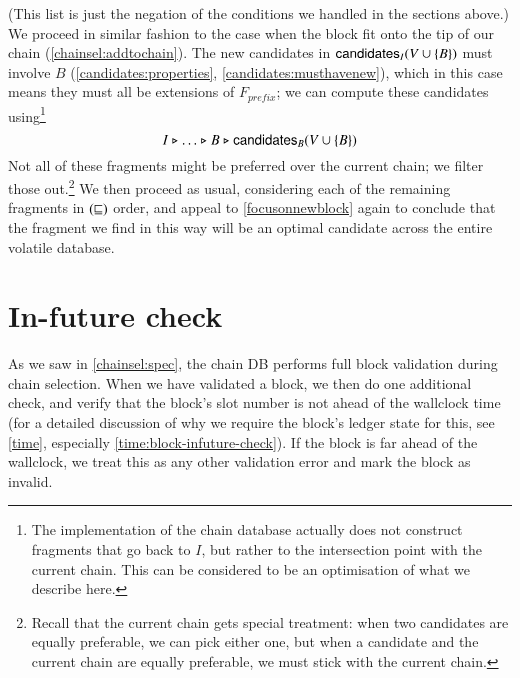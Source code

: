 (This list is just the negation of the conditions we handled in the sections
above.)
We proceed in similar fashion to the case when the block fit onto the tip of our
chain (\cref{chainsel:addtochain}). The new candidates in $\mathsf{candidates}_I(V \cup
\{B\})$ must involve $B$ (\cref{candidates:properties},
\cref{candidates:musthavenew}), which in this case means they must all be
extensions of $F_\mathit{prefix}$; we can compute these candidates
using\footnote{The implementation of the chain database actually does not
construct fragments that go back to $I$, but rather to the intersection point
with the current chain. This can be considered to be an optimisation of what we
describe here.}
$$I \mathrel{\triangleright} \ldots \mathrel{\triangleright} B \mathrel{\triangleright} \mathsf{candidates}_B(V \cup \{B\})$$
Not all of these fragments might be preferred over the current chain; we filter
those out.\footnote{Recall that the current chain gets special treatment: when
two candidates are equally preferable, we can pick either one, but when a
candidate and the current chain are equally preferable, we must stick with the
current chain.} We then proceed as usual, considering each of the remaining
fragments in $(\mathrel{\sqsubseteq})$ order, and appeal to \cref{focusonnewblock}
again to conclude that the fragment we find in this way will be an optimal
candidate across the entire volatile database.


%
%
%
%
%
%

\section{In-future check}
\label{chainsel:infuture}

As we saw in \cref{chainsel:spec}, the chain DB performs full
block validation during chain selection. When we have validated a block, we then
do one additional check, and verify that the block's slot number is not ahead of
the wallclock time (for a detailed discussion of why we require the block's
ledger state for this, see \cref{time}, especially
\cref{time:block-infuture-check}). If the block is far ahead of the wallclock,
we treat this as any other validation error and mark the block as invalid.

